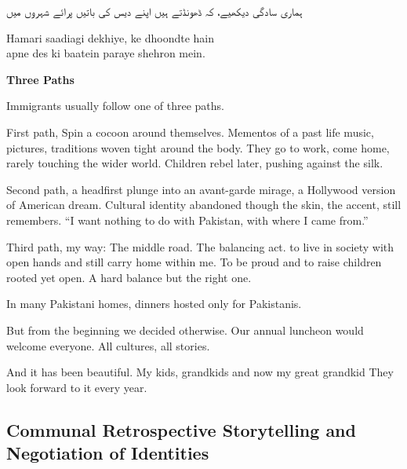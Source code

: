 \bigskip
\begin{center}
\begin{minipage}{.5\linewidth}
\begin{urdu}
\noindent
ہماری سادگی دیکھیے، کہ ڈھونڈتے ہیں\justifyurdu
اپنے دیس کی باتیں پرائے شہروں میں\justifyurdu
\end{urdu}
\vspace{1\baselineskip}
    \begin{itshape}
Hamari saadiagi dekhiye, ke dhoondte hain\\
apne des ki baatein paraye shehron mein.\\
    \end{itshape}
    \end{minipage}
\end{center}
    


\textbf{Three Paths}

\begin{FoundPoem}
Immigrants 
usually follow one of three paths.

First path,
Spin a cocoon around themselves.
Mementos of a past life
music,
pictures,
traditions
woven tight around the body.
They go to work,
come home,
rarely touching the wider world.
Children rebel later,
pushing against the silk.

Second path,
a headfirst plunge
into an avant-garde mirage,
a Hollywood version of American dream.
Cultural identity abandoned
though the skin,
the accent,
still remembers.
``I want nothing to do with Pakistan,
with where I came from.''

Third path, my way:
 The middle road.
             The balancing act.
to live in society with open hands
and still carry home within me.
To be proud
and to raise children
rooted
yet open.
A hard balance
but the right one.

In many Pakistani homes,
dinners hosted 
only for Pakistanis.

But from the beginning
we decided otherwise.
Our annual luncheon
would welcome everyone.
All cultures,
all stories.

And it has been beautiful.
My kids, grandkids and now my great grandkid
They look forward to it
every year.
\end{FoundPoem}

\subsection{Communal Retrospective Storytelling and Negotiation of Identities}

